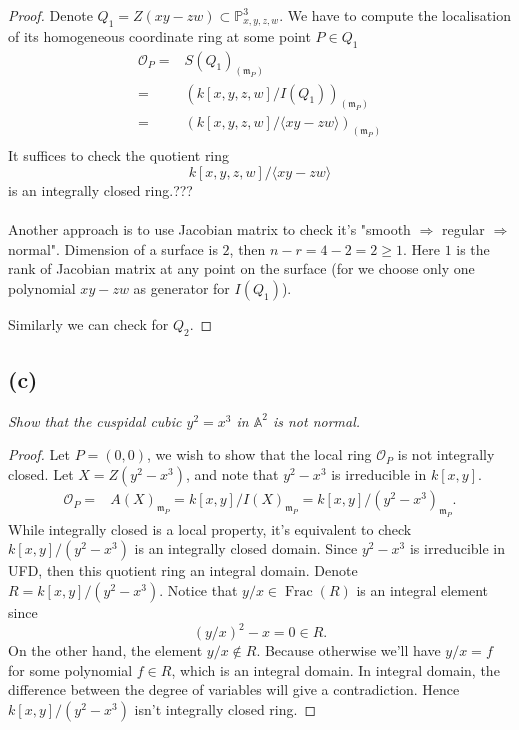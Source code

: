 \begin{proof}
	Denote $Q_1=Z(xy-zw)\subset \mathbb P^3_{x,y,z,w}$. We have to compute the localisation of its homogeneous coordinate ring at some point $P\in Q_1$
	\begin{align*}
		\mathscr O_P =& S(Q_1)_{(\mathfrak m_P)}\\
		=& (k[x,y,z,w]/I(Q_1))_{(\mathfrak m_P)}\\
		=& (k[x,y,z,w]/\langle xy-zw\rangle)_{(\mathfrak m_P)}\\
	\end{align*}
	It suffices to check the quotient ring
	\[k[x,y,z,w]/\langle xy-zw\rangle \] is an integrally closed ring.???\\\\

	Another approach is to use Jacobian matrix to check it's "smooth $\Rightarrow$ regular $\Rightarrow$ normal". Dimension of a surface is $2$, then $n-r=4-2=2\geq 1$. Here $1$ is the rank of Jacobian matrix at any point on the surface (for we choose only one polynomial $xy-zw$ as generator for $I(Q_1)$). 

	Similarly we can check for $Q_2$.

\end{proof}

\subsection{(c)}
\textit{Show that the cuspidal cubic $y^2=x^3$ in $\mathbb A^2$ is not normal.}

\begin{proof}
	Let $P=(0,0)$, we wish to show that the local ring $\mathscr O_P$ is not integrally closed. Let $X=Z(y^2-x^3)$, and note that $y^2-x^3$ is irreducible in $k[x,y]$.
	\begin{align*}
		\mathscr O_P =& A(X)_{\mathfrak m_P} = k[x,y]/I(X)_{\mathfrak m_P}=k[x,y]/(y^2-x^3)_{\mathfrak m_P}.
	\end{align*}
	While integrally closed is a local property, it's equivalent to check $k[x,y]/(y^2-x^3)$ is an integrally closed domain. Since $y^2-x^3$ is irreducible in UFD, then this quotient ring an integral domain. Denote $R=k[x,y]/(y^2-x^3)$. Notice that $y/x\in \operatorname{Frac}(R)$ is an integral element since 
	\[(y/x)^2-x=0\in R.\] On the other hand, the element $y/x\notin R$. Because otherwise we'll have $y/x=f$ for some polynomial $f\in R$, which is an integral domain. In integral domain, the difference between the degree of variables will give a contradiction. Hence $k[x,y]/(y^2-x^3)$ isn't integrally closed ring.
\end{proof}

